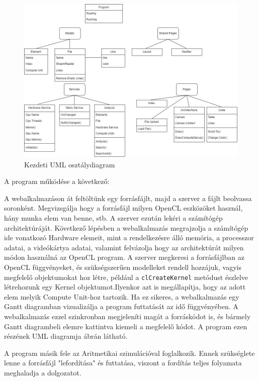 \begin{figure}[h]
\centering
\includegraphics[scale=0.4]{images/UML.jpg}
\caption{Kezdeti UML osztálydiagram}
\label{fig:uml}
\end{figure}

A program működése a következő:

A webalkalmazáson át feltöltünk egy forrásfájlt, majd a szerver a fájlt beolvassa soronként. Megvizsgálja hogy a forrásfájl milyen OpenCL eszközöket használ, hány munka elem van benne, stb. A szerver ezután lekéri a számítógép architektúráját. Következő lépésben a webalkalmazás megrajzolja a számítógép ide vonatkozó Hardware elemeit, mint a rendelkezésre álló memória, a processzor adatai, a videókártya adatai, valamint felvázolja hogy az architektúrát milyen módon használná az OpenCL program. A szerver megkeresi a forrásfájlban az OpenCL függvényeket, és szükségszerűen modelleket rendell hozzájuk, vagyis megfelelő objektumokat hoz létre, például a \texttt{clCreateKernel} metódust észlelve létrehozunk egy Kernel objektumot.Ilyenkor azt is megállapítja, hogy az adott elem melyik Compute Unit-hoz tartozik. Ha ez sikeres, a webalkalmazás egy Gantt diagramban vizualizálja a program futtatását az idő függvényében. A webalkalmazás ezzel szinkronban megjeleníti magát a forráskódot is, és bármely Gantt diagrambeli elemre kattintva kiemeli a megfelelő kódot. A program ezen részének UML diagramja  ábrán látható.

A program másik fele az Aritmetikai szimulációval foglalkozik. Ennek szükséglete lenne a forrásfájl "lefordítása" és futtatása, viszont a fordítás teljes folyamata meghaladja a dolgozatot.

